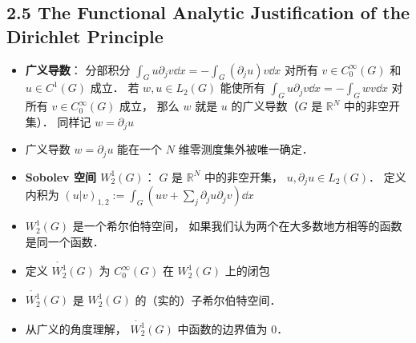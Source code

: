 \subsection{2.5 The Functional Analytic Justification of the Dirichlet Principle}
\begin{itemize}
\item \textbf{广义导数}： 分部积分 $\int_G u\partial_j v\dd{x} = -\int_G (\partial_j u)v\dd{x}$ 对所有 $v \in C_0^\infty(G)$ 和 $u \in C^1(G)$ 成立． 若 $w, u\in L_2(G)$ 能使所有 $\int_G u\partial_j v\dd{x} = -\int_G wv\dd{x}$ 对所有 $v \in C_0^\infty(G)$ 成立， 那么 $w$ 就是 $u$ 的广义导数（$G$ 是 $\mathbb R^N$ 中的非空开集）． 同样记 $w = \partial_j u$

\item 广义导数 $w = \partial_j u$ 能在一个 $N$ 维零测度集外被唯一确定．

\item \textbf{Sobolev 空间 $W_2^1(G)$}： $G$ 是 $\mathbb R^N$ 中的非空开集， $u, \partial_ju \in L_2(G)$． 定义内积为 $(u|v)_{1,2} := \int_G(uv + \sum_j \partial_j u\partial_j v) \dd{x}$

\item $W_2^1(G)$ 是一个希尔伯特空间， 如果我们认为两个在大多数地方相等的函数是同一个函数．

\item 定义 $\mathring {W_2^1}(G)$ 为 $C_0^\infty(G)$ 在 $W_2^1(G)$ 上的闭包

\item $\mathring {W_2^1}(G)$ 是 $W_2^1(G)$ 的（实的）子希尔伯特空间．

\item 从广义的角度理解， $\mathring {W_2^1}(G)$ 中函数的边界值为 0．
\end{itemize}

